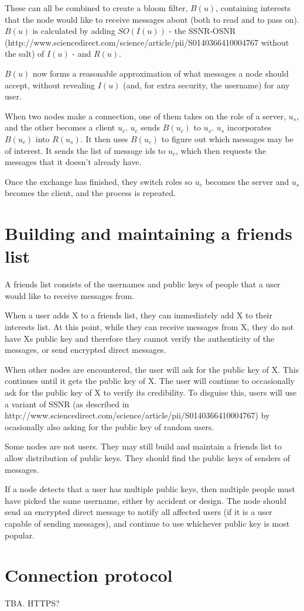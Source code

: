 \documentclass{article}
\begin{document}
These can all be combined to create a bloom filter, $B(u)$, containing interests that the node would like to receive messages about (both to read and to pass on). $B(u)$ is calculated by adding $SO(I(u))$ - the SSNR-OSNR (http://www.sciencedirect.com/science/article/pii/S0140366410004767 without the salt) of $I(u)$ - and $R(u)$.

$B(u)$ now forms a reasonable approximation of what messages a node should accept, without revealing $I(u)$ (and, for extra security, the username) for any user.

When two nodes make a connection, one of them takes on the role of a server, $u_s$, and the other becomes a client $u_c$. $u_c$ sends $B(u_c)$ to $u_s$. $u_s$ incorporates $B(u_c)$ into $R(u_s)$. It then uses $B(u_c)$ to figure out which messages may be of interest. It sends the list of message ids to $u_c$, which then requests the messages that it doesn't already have.

Once the exchange has finished, they switch roles so $u_c$ becomes the server and $u_s$ becomes the client, and the process is repeated.
 

\section*{Building and maintaining a friends list}
A friends list consists of the usernames and public keys of people that a user would like to receive messages from.

When a user adds X to a friends list, they can immediately add X to their interests list. At this point, while they can receive messages from X, they do not have Xs public key and therefore they cannot verify the authenticity of the messages, or send encrypted direct messages.

When other nodes are encountered, the user will ask for the public key of X. This continues until it gets the public key of X. The user will continue to occasionally ask for the public key of X to verify its credibility. To disguise this, users will use a variant of SSNR (as described in http://www.sciencedirect.com/science/article/pii/S0140366410004767) by ocasionally also asking for the public key of random users.
 
Some nodes are not users. They may still build and maintain a friends list to allow distribution of public keys. They should find the public keys of senders of messages.
 
If a node detects that a user has multiple public keys, then multiple people must have picked the same username, either by accident or design. The node should send an encrypted direct message to notify all affected users (if it is a user capable of sending messages), and continue to use whichever public key is most popular.

\section*{Connection protocol}
TBA. HTTPS?
\end{document}
